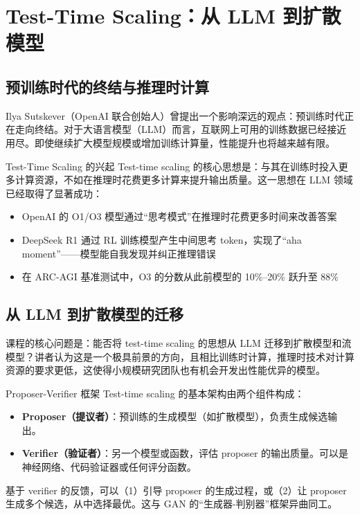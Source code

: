 \section{Test-Time Scaling：从 LLM 到扩散模型}

\subsection{预训练时代的终结与推理时计算}

Ilya Sutskever（OpenAI 联合创始人）曾提出一个影响深远的观点：预训练时代正在走向终结。对于大语言模型（LLM）而言，互联网上可用的训练数据已经接近用尽。即使继续扩大模型规模或增加训练计算量，性能提升也将越来越有限。

\begin{knowledgebox}{Test-Time Scaling 的兴起}
Test-time scaling 的核心思想是：与其在训练时投入更多计算资源，不如在推理时花费更多计算来提升输出质量。这一思想在 LLM 领域已经取得了显著成功：
\begin{itemize}
    \item OpenAI 的 O1/O3 模型通过``思考模式''在推理时花费更多时间来改善答案
    \item DeepSeek R1 通过 RL 训练模型产生中间思考 token，实现了``aha moment''——模型能自我发现并纠正推理错误
    \item 在 ARC-AGI 基准测试中，O3 的分数从此前模型的 10\%--20\% 跃升至 88\%
\end{itemize}
\end{knowledgebox}

\subsection{从 LLM 到扩散模型的迁移}

课程的核心问题是：能否将 test-time scaling 的思想从 LLM 迁移到扩散模型和流模型？讲者认为这是一个极具前景的方向，且相比训练时计算，推理时技术对计算资源的要求更低，这使得小规模研究团队也有机会开发出性能优异的模型。

\begin{importantbox}{Proposer-Verifier 框架}
Test-time scaling 的基本架构由两个组件构成：
\begin{itemize}
    \item \textbf{Proposer（提议者）}：预训练的生成模型（如扩散模型），负责生成候选输出。
    \item \textbf{Verifier（验证者）}：另一个模型或函数，评估 proposer 的输出质量。可以是神经网络、代码验证器或任何评分函数。
\end{itemize}
基于 verifier 的反馈，可以（1）引导 proposer 的生成过程，或（2）让 proposer 生成多个候选，从中选择最优。这与 GAN 的``生成器-判别器''框架异曲同工。
\end{importantbox}

